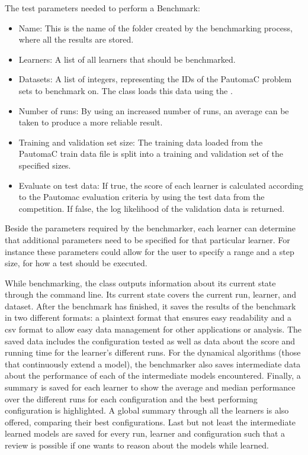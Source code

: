 The test parameters needed to perform a Benchmark:

\begin{itemize}
	\item[] Name: This is the name of the folder created by the benchmarking process, where all the results are stored.
	\item[] Learners: A list of all learners that should be benchmarked.
	\item[] Datasets: A list of integers, representing the IDs of the PautomaC problem sets to benchmark on. The  class loads this data using the .
	\item[] Number of runs: By using an increased number of runs, an average can be taken to produce a more reliable result.
	\item[] Training and validation set size: The training data loaded from the PautomaC train data file is split into a training and validation set of the specified sizes.
	\item[] Evaluate on test data: If true, the score of each learner is calculated according to the Pautomac evaluation criteria by using the test data from the competition. If false, the log likelihood of the validation data is returned.
\end{itemize}

Beside the parameters required by the benchmarker, each learner can determine that additional parameters need to be specified for that particular learner. For instance these parameters could allow for the user to specify a range and a step size, for how a test should be executed.

While benchmarking, the  class outputs information about its current state through the command line. Its current state covers the current run, learner, and dataset. After the benchmark has finished, it saves the results of the benchmark in two different formats: a plaintext format that ensures easy readability and a \gls{csv} format to allow easy data management for other applications or analysis. The saved data includes the configuration tested as well as data about the score and running time for the learner's different runs. For the dynamical algorithms (those that continuously extend a model), the benchmarker also saves intermediate data about the performance of each of the intermediate models encountered. 
Finally, a summary is saved for each learner to show the average and median performance over the different runs for each configuration and the best performing configuration is highlighted. A global summary through all the learners is also offered, comparing their best configurations. Last but not least the intermediate learned models are saved for every run, learner and configuration such that a review is possible if one wants to reason about the models while learned.


